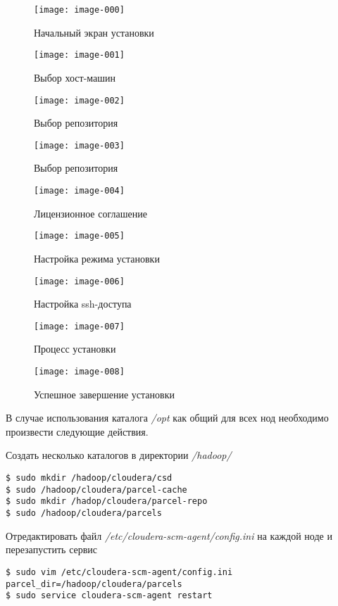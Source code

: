 \begin{figure}[ht!]
    \center
    \texttt{[image: image-000]}
    \caption{Начальный экран установки}
    \label{img:first}
\end{figure}

\newpage

\begin{figure}[ht!]
    \center
    \texttt{[image: image-001]}
    \caption{Выбор хост-машин}
    \texttt{[image: image-002]}
    \caption{Выбор репозитория}
\end{figure}

\newpage

\begin{figure}[ht!]
    \center
    \texttt{[image: image-003]}
    \caption{Выбор репозитория}
    \texttt{[image: image-004]}
    \caption{Лицензионное соглашение}
\end{figure}

\newpage

\begin{figure}[ht!]
    \center
    \texttt{[image: image-005]}
    \caption{Настройка режима установки}
    \texttt{[image: image-006]}
    \caption{Настройка ssh-доступа}
\end{figure}

\newpage

\begin{figure}[ht!]
    \center
    \texttt{[image: image-007]}
    \caption{Процесс установки}
    \texttt{[image: image-008]}
    \caption{Успешное завершение установки}
\end{figure}

В случае использования каталога \emph{/opt} как общий для всех нод необходимо произвести 
следующие действия.

Создать несколько каталогов в директории \emph{/hadoop/}
\begin{lstlisting}
$ sudo mkdir /hadoop/cloudera/csd
$ sudo /hadoop/cloudera/parcel-cache
$ sudo mkdir /hadop/cloudera/parcel-repo
$ sudo /hadoop/cloudera/parcels
\end{lstlisting}
Отредактировать файл \emph{/etc/cloudera-scm-agent/config.ini}\cite{parcels} на каждой ноде и 
перезапустить сервис
\begin{lstlisting}
$ sudo vim /etc/cloudera-scm-agent/config.ini
parcel_dir=/hadoop/cloudera/parcels
$ sudo service cloudera-scm-agent restart
\end{lstlisting}

